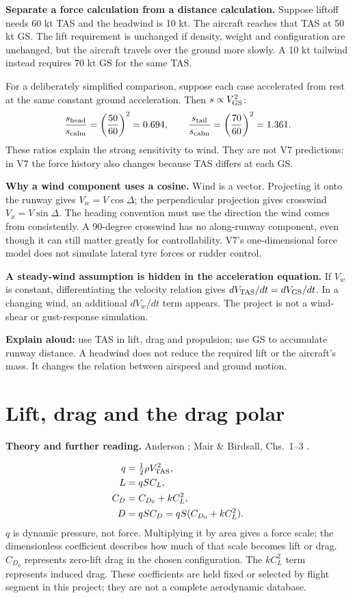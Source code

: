 \documentclass[11pt,letterpaper]{article}
\newcommand{\topic}[1]{\clearpage\section{#1}}
\newcommand{\reading}[1]{{\small\color{navy}\textbf{Theory and further reading.} #1\par}\vspace{3pt}}
\begin{document}
\textbf{Separate a force calculation from a distance calculation.}
Suppose liftoff needs 60 kt TAS and the headwind is 10 kt. The aircraft reaches
that TAS at 50 kt GS. The lift requirement is unchanged if density, weight and
configuration are unchanged, but the aircraft travels over the ground more
slowly. A 10 kt tailwind instead requires 70 kt GS for the same TAS.

For a deliberately simplified comparison, suppose each case accelerated from
rest at the same constant ground acceleration. Then $s\propto V_{\rm GS}^2$:
\[
\frac{s_{\rm head}}{s_{\rm calm}}=\left(\frac{50}{60}\right)^2=0.694,
\qquad
\frac{s_{\rm tail}}{s_{\rm calm}}=\left(\frac{70}{60}\right)^2=1.361.
\]
These ratios explain the strong sensitivity to wind. They are not V7 predictions:
in V7 the force history also changes because TAS differs at each GS.

\textbf{Why a wind component uses a cosine.}
Wind is a vector. Projecting it onto the runway gives $V_w=V\cos\Delta$;
the perpendicular projection gives crosswind $V_x=V\sin\Delta$.
The heading convention must use the direction the wind comes from consistently.
A 90-degree crosswind has no along-runway component, even though it can still
matter greatly for controllability. V7's one-dimensional force model does not
simulate lateral tyre forces or rudder control.

\textbf{A steady-wind assumption is hidden in the acceleration equation.}
If $V_w$ is constant, differentiating the velocity relation gives
$dV_{\rm TAS}/dt=dV_{\rm GS}/dt$. In a changing wind, an additional $dV_w/dt$
term appears. The project is not a wind-shear or gust-response simulation.

\begin{keyidea}
\textbf{Explain aloud:} use TAS in lift, drag and propulsion; use GS to accumulate
runway distance. A headwind does not reduce the required lift or the aircraft's
mass. It changes the relation between airspeed and ground motion.
\end{keyidea}

\topic{Lift, drag and the drag polar}
\reading{Anderson \cite{anderson-performance}; Mair \& Birdsall, Chs.~1--3 \cite{mair}.}
\begin{align*}
q&=\tfrac12\rho V_{\rm TAS}^2,\\
L&=qSC_L,\\
C_D&=C_{D_0}+kC_L^2,\\
D&=qSC_D=qS(C_{D_0}+kC_L^2).
\end{align*}
$q$ is dynamic pressure, not force. Multiplying it by area gives a force scale;
the dimensionless coefficient describes how much of that scale becomes lift or drag.
$C_{D_0}$ represents zero-lift drag in the chosen configuration. The $kC_L^2$
term represents induced drag. These coefficients are held fixed or selected by
flight segment in this project; they are not a complete aerodynamic database.
\end{document}
